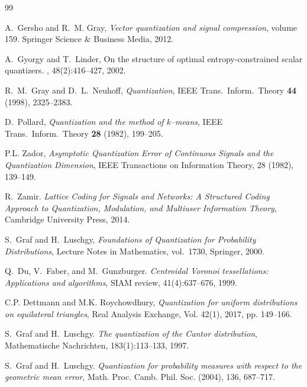 \documentclass[12pt, reqno]{amsart}
\theoremstyle{plain}
\theoremstyle{definition}
\begin{document}
\begin{thebibliography}{99}


A.~Gersho and R.~M. Gray, 
\emph{Vector quantization and signal compression}, volume 159.
 Springer Science \& Business Media, 2012.
 

 
A.~Gyorgy and T.~Linder, 
\newblock On the structure of optimal entropy-constrained scalar quantizers.
, 48(2):416--427, 2002.


R.~M.~Gray and D.~L.~Neuhoff, \emph{Quantization}, IEEE Trans.\ Inform.\
Theory \textbf{44} (1998), 2325--2383.





D.~Pollard, \emph{Quantization and the method of $k$--means}, IEEE Trans.\
Inform.\ Theory \textbf{28} (1982), 199--205.

P.L. Zador, \emph{Asymptotic Quantization Error of Continuous Signals and the Quantization Dimension}, IEEE Transactions on Information Theory, 28 (1982), 139--149.

\bibitem{Zamir2014}
R.~Zamir.
\emph {\em Lattice Coding for Signals and Networks: A Structured Coding
  Approach to Quantization, Modulation, and Multiuser Information Theory}, 
  Cambridge University Press, 2014.

S.~Graf and H.~Luschgy, \emph{Foundations of Quantization for Probability
Distributions}, Lecture Notes in Mathematics, vol.~1730, Springer, 2000.

\bibitem{DFG}
Q.~Du, V.~Faber, and M.~Gunzburger.
\emph{Centroidal {V}oronoi tessellations: Applications and algorithms},
 SIAM review, 41(4):637--676, 1999.

 

 

 C.P. Dettmann and M.K. Roychowdhury, \emph{Quantization for uniform distributions on equilateral triangles}, Real Analysis Exchange, Vol. 42(1), 2017, pp. 149--166.

\bibitem{GrafLuschgy1997}
S.~Graf and H.~Luschgy.
\emph{The quantization of the {C}antor distribution},
 Mathematische Nachrichten, 183(1):113--133, 1997.

S.~Graf and H.~Luschgy.
 \emph{Quantization for probability measures with respect to the geometric mean error}, Math. Proc. Camb. Phil. Soc. (2004), 136, 687--717. 


\end{thebibliography}
\end{document}
